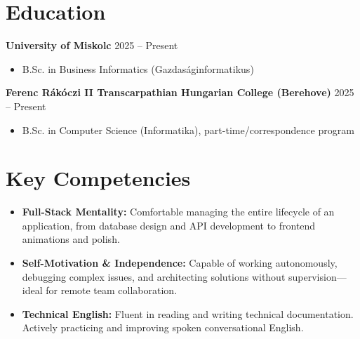 \documentclass[10pt,a4paper]{article}
\begin{document}
\section{Education}
\textbf{University of Miskolc} \hfill 2025 -- Present
\begin{itemize}
    \item B.Sc. in Business Informatics (Gazdaságinformatikus)
\end{itemize}
\vspace{4pt}
\textbf{Ferenc Rákóczi II Transcarpathian Hungarian College (Berehove)} \hfill 2025 -- Present
\begin{itemize}
    \item B.Sc. in Computer Science (Informatika), part-time/correspondence program
\end{itemize}

\section{Key Competencies}
\begin{itemize}
    \item \textbf{Full-Stack Mentality:} Comfortable managing the entire lifecycle of an application, from database design and API development to frontend animations and polish.
    \item \textbf{Self-Motivation \& Independence:} Capable of working autonomously, debugging complex issues, and architecting solutions without supervision—ideal for remote team collaboration.
    \item \textbf{Technical English:} Fluent in reading and writing technical documentation. Actively practicing and improving spoken conversational English.
\end{itemize}
\end{document}
